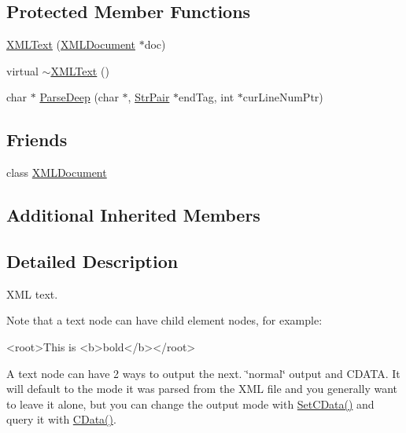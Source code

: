 \subsection*{Protected Member Functions}
\begin{DoxyCompactItemize}
\item 
\hyperlink{classtinyxml2_1_1_x_m_l_text_ad9f46d70e61e5386ead93728d8b90267}{X\+M\+L\+Text} (\hyperlink{classtinyxml2_1_1_x_m_l_document}{X\+M\+L\+Document} $\ast$doc)
\item 
virtual \hyperlink{classtinyxml2_1_1_x_m_l_text_ae9b8790d0dc13914394dbd7437c0e59d}{$\sim$\+X\+M\+L\+Text} ()
\item 
char $\ast$ \hyperlink{classtinyxml2_1_1_x_m_l_text_a9810dd9b82c9020baa0c3bdcb4469aac}{Parse\+Deep} (char $\ast$, \hyperlink{classtinyxml2_1_1_str_pair}{Str\+Pair} $\ast$end\+Tag, int $\ast$cur\+Line\+Num\+Ptr)
\end{DoxyCompactItemize}
\subsection*{Friends}
\begin{DoxyCompactItemize}
\item 
class \hyperlink{classtinyxml2_1_1_x_m_l_text_a4eee3bda60c60a30e4e8cd4ea91c4c6e}{X\+M\+L\+Document}
\end{DoxyCompactItemize}
\subsection*{Additional Inherited Members}


\subsection{Detailed Description}
X\+ML text.

Note that a text node can have child element nodes, for example\+: \begin{DoxyVerb}<root>This is <b>bold</b></root>
\end{DoxyVerb}


A text node can have 2 ways to output the next. \char`\"{}normal\char`\"{} output and C\+D\+A\+TA. It will default to the mode it was parsed from the X\+ML file and you generally want to leave it alone, but you can change the output mode with \hyperlink{classtinyxml2_1_1_x_m_l_text_ad080357d76ab7cc59d7651249949329d}{Set\+C\+Data()} and query it with \hyperlink{classtinyxml2_1_1_x_m_l_text_ac1bb5ea4166c320882d9e0ad16fd385b}{C\+Data()}. 

